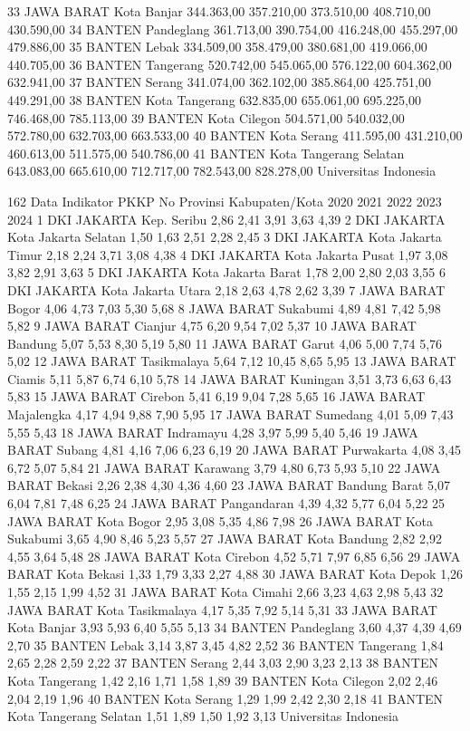 33 JAWA BARAT Kota Banjar 344.363,00 357.210,00 373.510,00 408.710,00 430.590,00
34 BANTEN Pandeglang 361.713,00 390.754,00 416.248,00 455.297,00 479.886,00
35 BANTEN Lebak 334.509,00 358.479,00 380.681,00 419.066,00 440.705,00
36 BANTEN Tangerang 520.742,00 545.065,00 576.122,00 604.362,00 632.941,00
37 BANTEN Serang 341.074,00 362.102,00 385.864,00 425.751,00 449.291,00
38 BANTEN Kota Tangerang 632.835,00 655.061,00 695.225,00 746.468,00 785.113,00
39 BANTEN Kota Cilegon 504.571,00 540.032,00 572.780,00 632.703,00 663.533,00
40 BANTEN Kota Serang 411.595,00 431.210,00 460.613,00 511.575,00 540.786,00
41 BANTEN Kota Tangerang Selatan 643.083,00 665.610,00 712.717,00 782.543,00 828.278,00
Universitas Indonesia

162
Data Indikator PKKP
No Provinsi Kabupaten/Kota 2020 2021 2022 2023 2024
1 DKI JAKARTA Kep. Seribu 2,86 2,41 3,91 3,63 4,39
2 DKI JAKARTA Kota Jakarta Selatan 1,50 1,63 2,51 2,28 2,45
3 DKI JAKARTA Kota Jakarta Timur 2,18 2,24 3,71 3,08 4,38
4 DKI JAKARTA Kota Jakarta Pusat 1,97 3,08 3,82 2,91 3,63
5 DKI JAKARTA Kota Jakarta Barat 1,78 2,00 2,80 2,03 3,55
6 DKI JAKARTA Kota Jakarta Utara 2,18 2,63 4,78 2,62 3,39
7 JAWA BARAT Bogor 4,06 4,73 7,03 5,30 5,68
8 JAWA BARAT Sukabumi 4,89 4,81 7,42 5,98 5,82
9 JAWA BARAT Cianjur 4,75 6,20 9,54 7,02 5,37
10 JAWA BARAT Bandung 5,07 5,53 8,30 5,19 5,80
11 JAWA BARAT Garut 4,06 5,00 7,74 5,76 5,02
12 JAWA BARAT Tasikmalaya 5,64 7,12 10,45 8,65 5,95
13 JAWA BARAT Ciamis 5,11 5,87 6,74 6,10 5,78
14 JAWA BARAT Kuningan 3,51 3,73 6,63 6,43 5,83
15 JAWA BARAT Cirebon 5,41 6,19 9,04 7,28 5,65
16 JAWA BARAT Majalengka 4,17 4,94 9,88 7,90 5,95
17 JAWA BARAT Sumedang 4,01 5,09 7,43 5,55 5,43
18 JAWA BARAT Indramayu 4,28 3,97 5,99 5,40 5,46
19 JAWA BARAT Subang 4,81 4,16 7,06 6,23 6,19
20 JAWA BARAT Purwakarta 4,08 3,45 6,72 5,07 5,84
21 JAWA BARAT Karawang 3,79 4,80 6,73 5,93 5,10
22 JAWA BARAT Bekasi 2,26 2,38 4,30 4,36 4,60
23 JAWA BARAT Bandung Barat 5,07 6,04 7,81 7,48 6,25
24 JAWA BARAT Pangandaran 4,39 4,32 5,77 6,04 5,22
25 JAWA BARAT Kota Bogor 2,95 3,08 5,35 4,86 7,98
26 JAWA BARAT Kota Sukabumi 3,65 4,90 8,46 5,23 5,57
27 JAWA BARAT Kota Bandung 2,82 2,92 4,55 3,64 5,48
28 JAWA BARAT Kota Cirebon 4,52 5,71 7,97 6,85 6,56
29 JAWA BARAT Kota Bekasi 1,33 1,79 3,33 2,27 4,88
30 JAWA BARAT Kota Depok 1,26 1,55 2,15 1,99 4,52
31 JAWA BARAT Kota Cimahi 2,66 3,23 4,63 2,98 5,43
32 JAWA BARAT Kota Tasikmalaya 4,17 5,35 7,92 5,14 5,31
33 JAWA BARAT Kota Banjar 3,93 5,93 6,40 5,55 5,13
34 BANTEN Pandeglang 3,60 4,37 4,39 4,69 2,70
35 BANTEN Lebak 3,14 3,87 3,45 4,82 2,52
36 BANTEN Tangerang 1,84 2,65 2,28 2,59 2,22
37 BANTEN Serang 2,44 3,03 2,90 3,23 2,13
38 BANTEN Kota Tangerang 1,42 2,16 1,71 1,58 1,89
39 BANTEN Kota Cilegon 2,02 2,46 2,04 2,19 1,96
40 BANTEN Kota Serang 1,29 1,99 2,42 2,30 2,18
41 BANTEN Kota Tangerang Selatan 1,51 1,89 1,50 1,92 3,13
Universitas Indonesia

